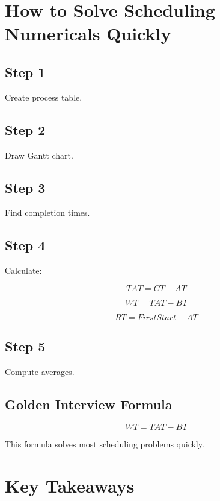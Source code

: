 \section{How to Solve Scheduling Numericals Quickly}

\subsection{Step 1}

Create process table.

\subsection{Step 2}

Draw Gantt chart.

\subsection{Step 3}

Find completion times.

\subsection{Step 4}

Calculate:

\[
TAT = CT - AT
\]

\[
WT = TAT - BT
\]

\[
RT = FirstStart - AT
\]

\subsection{Step 5}

Compute averages.

\subsection{Golden Interview Formula}

\[
WT = TAT - BT
\]

This formula solves most scheduling problems quickly.

\section{Key Takeaways}

